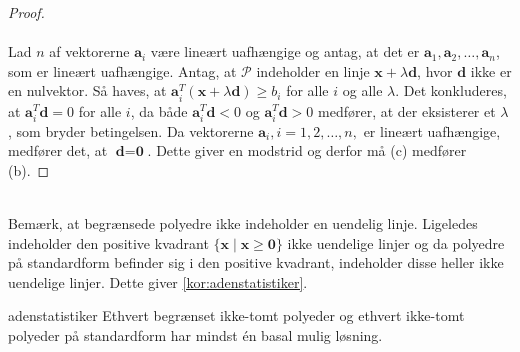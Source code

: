\begin{proof}
\\\\
%
Lad $n$ af vektorerne $\textbf{a}_i$ være lineært uafhængige og antag, at det er $\textbf{a}_1, \textbf{a}_2, \ldots , \textbf{a}_n$, som er lineært uafhængige.
Antag, at $\mathcal{P}$ indeholder en linje $\textbf{x} + \lambda \textbf{d}$, hvor $\textbf{d}$ ikke er en nulvektor.
Så haves, at $\textbf{a}_i^T (\textbf{x} + \lambda \textbf{d}) \geq b_i$ for alle $i$ og alle $\lambda$.
Det konkluderes, at $\textbf{a}_i^T \textbf{d} = 0$ for alle $i$, da både  $\textbf{a}_i^T \textbf{d} < 0$ og  $\textbf{a}_i^T \textbf{d} > 0$ medfører, at der eksisterer et $\lambda$, som bryder betingelsen.
Da vektorerne $\textbf{a}_i, i = 1, 2, \ldots, n,$ er lineært uafhængige, medfører det, at $\textbf{d}=\textbf{0}$.
Dette giver en modstrid og derfor må (c) medfører (b).
\end{proof}\\
%
Bemærk, at begrænsede polyedre ikke indeholder en uendelig linje.
Ligeledes indeholder den positive kvadrant $\{ \textbf{x} \mid \textbf{x} \geq \textbf{0}\}$ ikke uendelige linjer og da polyedre på standardform befinder sig i den positive kvadrant, indeholder disse heller ikke uendelige linjer.
Dette giver \ref{kor:adenstatistiker}.
\begin{kor}{}{adenstatistiker}
Ethvert begrænset ikke-tomt polyeder og ethvert ikke-tomt polyeder på standardform har mindst én basal mulig løsning.
\end{kor}
